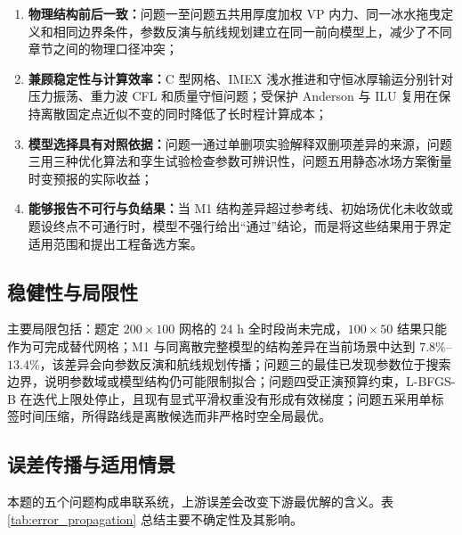 \documentclass[UTF8]{ctexart}
\begin{document}
\begin{enumerate}
\item \textbf{物理结构前后一致：}问题一至问题五共用厚度加权 VP 内力、同一冰水拖曳定义和相同边界条件，参数反演与航线规划建立在同一前向模型上，减少了不同章节之间的物理口径冲突；
\item \textbf{兼顾稳定性与计算效率：}C 型网格、IMEX 浅水推进和守恒冰厚输运分别针对压力振荡、重力波 CFL 和质量守恒问题；受保护 Anderson 与 ILU 复用在保持离散固定点近似不变的同时降低了长时程计算成本；
\item \textbf{模型选择具有对照依据：}问题一通过单删项实验解释双删项差异的来源，问题三用三种优化算法和孪生试验检查参数可辨识性，问题五用静态冰场方案衡量时变预报的实际收益；
\item \textbf{能够报告不可行与负结果：}当 M1 结构差异超过参考线、初始场优化未收敛或题设终点不可通行时，模型不强行给出“通过”结论，而是将这些结果用于界定适用范围和提出工程备选方案。
\end{enumerate}

\subsection{稳健性与局限性}

主要局限包括：题定 $200\times100$ 网格的 24 h 全时段尚未完成，$100\times50$ 结果只能作为可完成替代网格；M1 与同离散完整模型的结构差异在当前场景中达到 $7.8\%$--$13.4\%$，该差异会向参数反演和航线规划传播；问题三的最佳已发现参数位于搜索边界，说明参数域或模型结构仍可能限制拟合；问题四受正演预算约束，L-BFGS-B 在迭代上限处停止，且现有显式平滑权重没有形成有效梯度；问题五采用单标签时间压缩，所得路线是离散候选而非严格时空全局最优。

\subsection{误差传播与适用情景}

本题的五个问题构成串联系统，上游误差会改变下游最优解的含义。表 \ref{tab:error_propagation} 总结主要不确定性及其影响。
\end{document}

